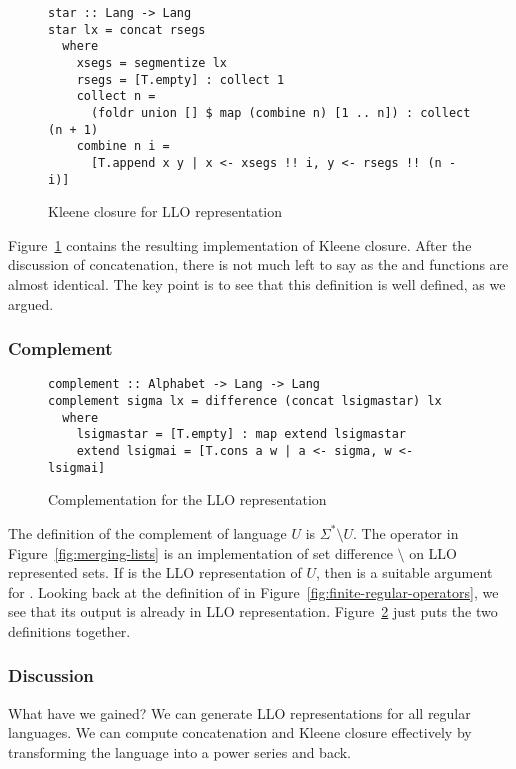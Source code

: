 \begin{figure}[tp]
\begin{lstlisting}
star :: Lang -> Lang
star lx = concat rsegs
  where
    xsegs = segmentize lx
    rsegs = [T.empty] : collect 1
    collect n =
      (foldr union [] $ map (combine n) [1 .. n]) : collect (n + 1)
    combine n i =
      [T.append x y | x <- xsegs !! i, y <- rsegs !! (n - i)]
\end{lstlisting}
  \caption{Kleene closure for LLO representation}
  \label{fig:star-with-segments}
\end{figure}
Figure~\ref{fig:star-with-segments} contains the resulting implementation of Kleene closure.
After the discussion of concatenation, there is not much left to say
as the  and  functions are almost
identical. The key point is to see that this definition is well
defined, as we argued.

\subsubsection{Complement}
\begin{figure}[tp]
\begin{lstlisting}
complement :: Alphabet -> Lang -> Lang
complement sigma lx = difference (concat lsigmastar) lx
  where
    lsigmastar = [T.empty] : map extend lsigmastar
    extend lsigmai = [T.cons a w | a <- sigma, w <- lsigmai]
\end{lstlisting}
  \caption{Complementation for the LLO representation}
  \label{fig:llo-complement}
\end{figure}
The definition of the complement of language $U$ is $\Sigma^*\setminus
U$.  The  operator in Figure~\ref{fig:merging-lists}
is an implementation of set difference $\setminus$ on LLO represented
sets.  If  is the LLO 
representation of $U$, then  is a suitable argument for
.  Looking back at the definition of
 in Figure~\ref{fig:finite-regular-operators}, we see
that its output is already in LLO
representation. Figure~\ref{fig:llo-complement} just puts the two
definitions together.

\subsubsection{Discussion}\label{sec:motivation-discussion}
What have we gained? We can generate LLO
representations for all regular languages. We can compute
concatenation and Kleene closure effectively by transforming the
language into a power series and back.

